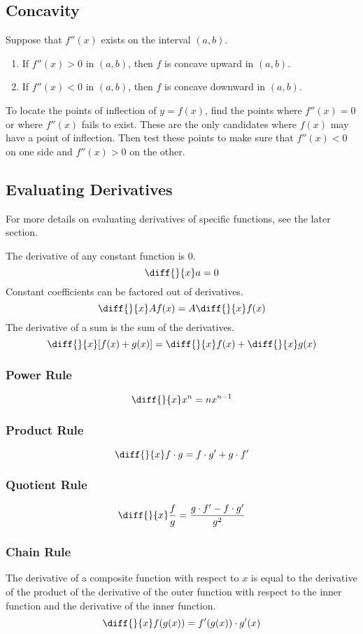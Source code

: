 \documentclass{artikel3}
\newcommand{\ddx}{\diff{}{x}}
\begin{document}
\subsection{Concavity}
Suppose that $f''(x)$ exists on the interval $(a,b)$.
\begin{enumerate}
\item{If $f''(x)>0$ in $(a,b)$, then $f$ is concave upward in $(a,b)$.}
\item{If $f''(x)<0$ in $(a,b)$, then $f$ is concave downward in $(a,b)$.}
\end{enumerate}
To locate the points of inflection of $y=f(x)$, find the points where 
$f''(x)=0$ or where $f''(x)$ fails to exist. These are the only candidates where 
$f(x)$ may have a point of inflection. Then test these points to make sure that 
$f''(x)<0$ on one side and $f''(x)>0$ on the other.

\subsection{Evaluating Derivatives}
For more details on evaluating derivatives of specific functions, see the later section.

The derivative of any constant function is $0$.
\[ \ddx a=0 \]
Constant coefficients can be factored out of derivatives.
\[ \ddx Af(x)=A\ddx f(x) \]
The derivative of a sum is the sum of the derivatives.
\[ \ddx [f(x)+g(x)]=\ddx f(x)+\ddx g(x) \]

\subsubsection{Power Rule}
\[ \ddx x^n=nx^{n-1} \]

\subsubsection{Product Rule}
\[ \ddx f\cdot g=f\cdot g'+g\cdot f' \]

\subsubsection{Quotient Rule}
\[ \ddx \frac{f}{g}=\frac{g\cdot f'-f\cdot g'}{g^2} \]

\subsubsection{Chain Rule}
The derivative of a composite function with respect to $x$ is equal to the derivative 
of the product of the derivative of the outer function with respect to the inner 
function and the derivative of the inner function.
\[ \ddx f(g(x))=f'(g(x))\cdot g'(x) \]
\end{document}
